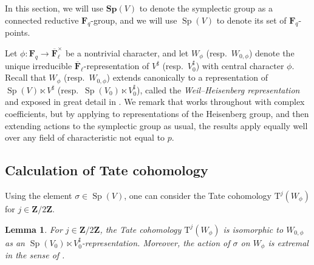 \documentclass[reqno]{amsart}
\numberwithin{equation}{subsection}
\newcommand{\F}{\mathbf{F}}
\newcommand{\Z}{\mathbf{Z}}
\newcommand{\ol}[1]{\overline{#1}}
\DeclareMathOperator{\Sp}{Sp}
\newcommand{\rT}{\ensuremath{\mathrm{T}}\xspace}
\newtheorem{lemma}[thm]{Lemma}
\theoremstyle{remark}
\numberwithin{equation}{subsection}
\numberwithin{figure}{subsection}
\begin{document}
In this section, we will use $\mathbf{Sp}(V)$ to denote the symplectic group as a connected reductive $\F_q$-group, and we will use $\Sp(V)$ to denote its set of $\F_q$-points.

Let $\phi\colon \F_q \to \ol\F_\ell^\times$ be a nontrivial character, and let $W_{\phi}$ (resp.\ $W_{0,\phi}$) denote the unique irreducible $\ol\F_\ell$-representation of $V^\sharp$ (resp.\ $V_0^\sharp$) with central character $\phi$. Recall that $W_\phi$ (resp.\ $W_{0,\phi}$) extends canonically to a representation of $\Sp(V) \ltimes V^\sharp$ (resp.\ $\Sp(V_0) \ltimes V_0^\sharp$), called the \emph{Weil--Heisenberg representation} and exposed in great detail in \cite{Ger77}. We remark that \cite{Ger77} works throughout with complex coefficients, but by applying \cite[Part III, \S 15.5, Proposition 43]{Serre77} to representations of the Heisenberg group, and then extending actions to the symplectic group as usual, the results apply equally well over any field of characteristic not equal to $p$.

\subsection{Calculation of Tate cohomology}
Using the element $\sigma \in \Sp(V)$, one can consider the Tate cohomology $\rT^j(W_{\phi})$ for $j \in \Z/2\Z$.

\begin{lemma}\label{lemma:tate-cohom-of-heisenberg}
For $j \in \Z/2\Z$, the Tate cohomology $\rT^j(W_\phi)$ is isomorphic to $W_{0,\phi}$ as an $\Sp(V_0) \ltimes V_0^\sharp$-representation. Moreover, the action of $\sigma$ on $W_\phi$ is extremal in the sense of \cite[Definition~3.5.3]{Cot26b}.
\end{lemma}
\end{document}

